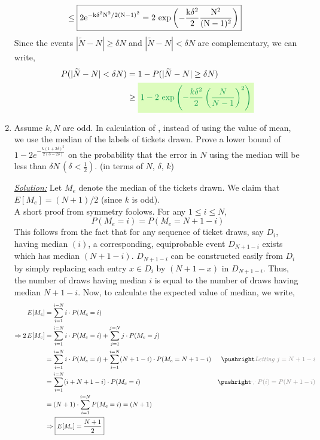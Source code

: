 \documentclass[12pt,titlepage]{report}
\begin{document}
\begin{enumerate}[label=(\alph*)]
\begin{align*}
        &\leq \boxed{2\rm{e}^{-k\delta^2 N^2/2(N-1)^2}=2\,\exp{\left(-\frac{k\delta^2}{2}\frac{ N^2}{(N-1)^2}\right)}}
    \end{align*}
    Since the events $|\widetilde{N}-N|\geq{\delta N}$ and $|\widetilde{N}-N|<\delta N$ are complementary, we can write,
    \begin{align*}
        P(|\widetilde{N}-N|<\delta N) &= 1-P(|\widetilde{N}-N|\geq{\delta N})\\
        &\geq \ans{$1-2\,\exp{\left(-\dfrac{k\delta^2}{2}\left(\dfrac{N}{N-1}\right)^2\right)}$}
    \end{align*}
    
    \item Assume $k, N$ are odd. In calculation of , instead of using the value of mean, we use the median of the labels of tickets drawn. Prove a lower bound of $1-2e^{-\frac{k(1+2\delta)^2}{2(3-2\delta)}}$ on the probability that the error in $N$ using the median will be less than $\delta N\,(\delta < \frac{1}{2})$. (in terms of $N,\, \delta,\, k$)
    \item[\underline{\textit{Solution:}}] Let $M_e$ denote the median of the tickets drawn. We claim that $E[M_e]=(N+1)/2$ (since $k$ is odd). \\
    A short proof from symmetry foolows. For any $1\leq i\leq N$, $$P(M_e=i)=P(M_e=N+1-i)$$ This follows from the fact that for any sequence of ticket draws, say $D_i$, having median $(i)$, a corresponding, equiprobable event $D_{N+1-i}$ exists which has median $(N+1-i)$. $D_{N+1-i}$ can be constructed easily from $D_i$ by simply replacing each entry $x\in D_i$ by $(N+1-x)$ in $D_{N+1-i}$. Thus, the number of draws having median $i$ is equal to the number of draws having median $N+1-i$. Now, to calculate the expected value of median, we write,
    \begin{align*}
        E[M_e] &= \sum_{i=1}^{i=N} i\cdot P(M_e=i) \\
        \Rightarrow 2\,E[M_e] &= \sum_{i=1}^{i=N} i\cdot P(M_e=i) + \sum_{j=1}^{j=N} j\cdot P(M_e=j) \\
        &= \sum_{i=1}^{i=N} i\cdot P(M_e=i) + \sum_{i=1}^{i=N} (N+1-i)\cdot P(M_e=N+1-i) \comment{\textit{Letting $j=N+1-i$}} \\
        &= \sum_{i=1}^{i=N} (i+N+1-i)\cdot P(M_e=i) \comment{\because P(i)=P(N+1-i)} \\
        &= (N+1)\cdot \sum_{i=1}^{i=N} P(M_e=i) = (N+1) \\
        &\Rightarrow \boxed{E[M_e]=\frac{N+1}{2}}
    \end{align*}
    

\end{enumerate}
\end{document}
